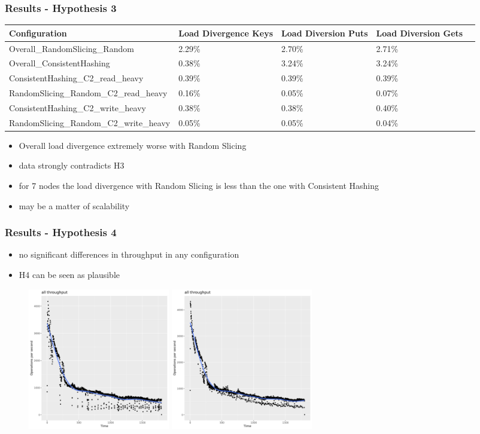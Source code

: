 \documentclass[aspectratio=169]{beamer}
\begin{document}
\begin{frame}
\frametitle{Results - Hypothesis 3}
\begin{table}
\begin{tabularx}{\textwidth}{|l|X|X|X|X|}
\hline
Configuration & Load Divergence Keys & Load Diversion Puts & Load Diversion Gets\\\hline
Overall\_RandomSlicing\_Random & 2.29\% & 2.70\% & 2.71\%\\
Overall\_ConsistentHashing & 0.38\% & 3.24\% & 3.24\%\\
ConsistentHashing\_C2\_read\_heavy & 0.39\% & 0.39\% & 0.39\%\\
RandomSlicing\_Random\_C2\_read\_heavy & 0.16\% & 0.05\% & 0.07\%\\
ConsistentHashing\_C2\_write\_heavy & 0.38\% & 0.38\% & 0.40\%\\
RandomSlicing\_Random\_C2\_write\_heavy & 0.05\% & 0.05\% & 0.04\%\\
\hline
\end{tabularx}
\end{table}
\begin{itemize}
\item Overall load divergence extremely worse with Random Slicing
\item data strongly contradicts H3
\item for 7 nodes the load divergence with Random Slicing is less than the one with Consistent Hashing
\item may be a matter of scalability
\end{itemize}
\end{frame}

\begin{frame}
\frametitle{Results - Hypothesis 4}
\begin{itemize}
\item no significant differences in throughput in any configuration
\item H4 can be seen as plausible
\end{itemize}
\begin{figure}
\includegraphics[width=0.3\textwidth]{RandomSlicing_Random_C0_read_heavy_throughput}
\includegraphics[width=0.3\textwidth]{ConsistentHashing_C0_read_heavy_throughput}
\end{figure}
\end{frame}
\end{document}
